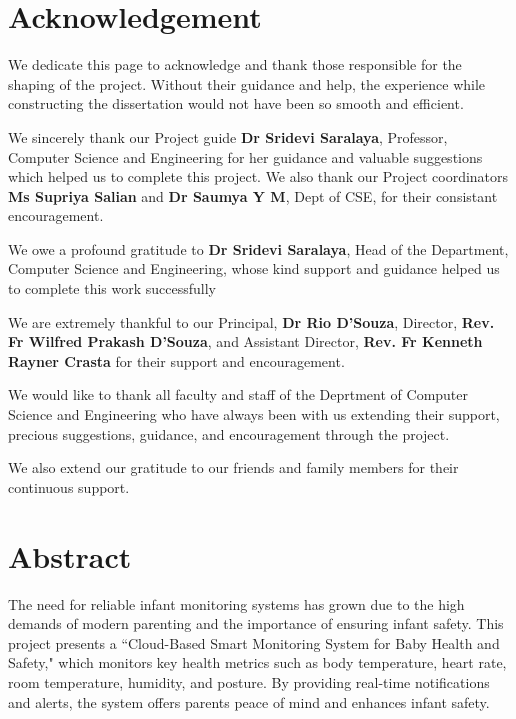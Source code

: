 \documentclass[12pt,a4paper]{report}
\begin{document}
\chapter*{\centering Acknowledgement}
We dedicate this page to acknowledge and thank those responsible for the shaping of the project. Without their guidance and help, the experience while constructing the dissertation would not have been so smooth and efficient.
\par
\vspace{0.15in}
\noindent We sincerely thank our Project guide \textbf{Dr Sridevi Saralaya}, Professor, Computer Science and Engineering for her guidance and valuable suggestions which helped us to complete this project. We also thank our Project coordinators \textbf{Ms Supriya Salian} and \textbf{Dr Saumya Y M},  Dept of CSE, for their consistant encouragement. 
\par
\vspace{0.15in}
\noindent We owe a profound gratitude to \textbf{Dr Sridevi Saralaya}, Head of the Department, Computer Science and Engineering, whose kind support and guidance helped us to complete this work successfully
\par
\vspace{0.15in}
\noindent We are extremely thankful to our Principal, \textbf{Dr Rio D’Souza}, Director,  \textbf{Rev. Fr Wilfred Prakash D'Souza}, and Assistant Director, \textbf{Rev. Fr Kenneth Rayner Crasta} for their support and encouragement.
\par
\vspace{0.15in}
\noindent We would like to thank all faculty and staff of the Deprtment of Computer Science and Engineering who have always been with us extending their support, precious suggestions, guidance, and encouragement through the project.
\par
\vspace{0.15in}
\noindent We also extend our gratitude to our friends and family members for their continuous support.


\pagestyle{plain}
\chapter*{\centering Abstract}
The need for reliable infant monitoring systems has grown due to the high demands of modern parenting and the importance of ensuring infant safety. This project presents a ``Cloud-Based Smart Monitoring System for Baby Health and Safety," which monitors key health metrics such as body temperature, heart rate, room temperature, humidity, and posture. By providing real-time notifications and alerts, the system offers parents peace of mind and enhances infant safety.
  
\end{document}
